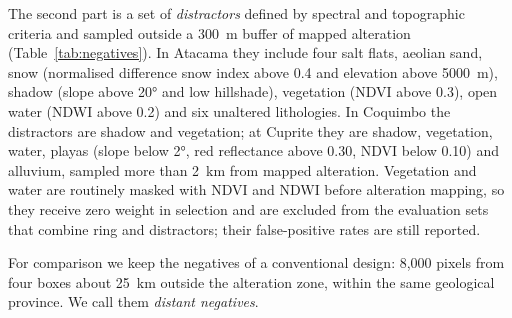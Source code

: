 \documentclass[preprint,authoryear,number]{elsarticle}
\begin{document}
The second part is a set of \emph{distractors} defined by spectral and topographic criteria and sampled outside a \SI{300}{\meter} buffer of mapped alteration (Table~\ref{tab:negatives}). In Atacama they include four salt flats, aeolian sand, snow (normalised difference snow index above 0.4 and elevation above \SI{5000}{\meter}), shadow (slope above \ang{20} and low hillshade), vegetation (NDVI above 0.3), open water (NDWI above 0.2) and six unaltered lithologies. In Coquimbo the distractors are shadow and vegetation; at Cuprite they are shadow, vegetation, water, playas (slope below \ang{2}, red reflectance above 0.30, NDVI below 0.10) and alluvium, sampled more than \SI{2}{\kilo\meter} from mapped alteration. Vegetation and water are routinely masked with NDVI and NDWI before alteration mapping, so they receive zero weight in selection and are excluded from the evaluation sets that combine ring and distractors; their false-positive rates are still reported.

For comparison we keep the negatives of a conventional design: 8{,}000 pixels from four boxes about \SI{25}{\kilo\meter} outside the alteration zone, within the same geological province. We call them \emph{distant negatives}.

\begin{table}[ht]
\centering
\caption{Negative groups and number of pixels per site.}
\label{tab:negatives}
\small
{}
\end{table}
\end{document}
